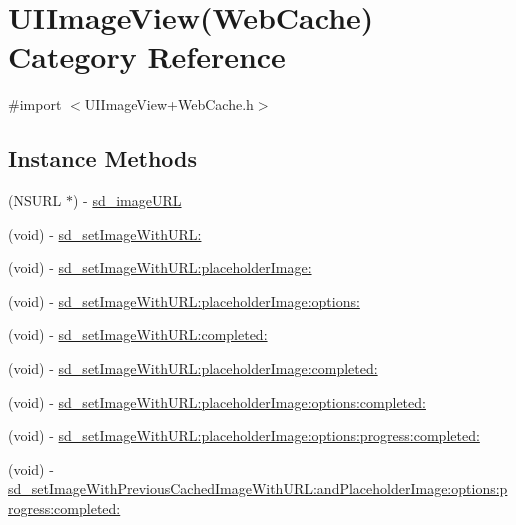 \hypertarget{category_u_i_image_view_07_web_cache_08}{}\section{U\+I\+Image\+View(Web\+Cache) Category Reference}
\label{category_u_i_image_view_07_web_cache_08}


{\ttfamily \#import $<$U\+I\+Image\+View+\+Web\+Cache.\+h$>$}

\subsection*{Instance Methods}
\begin{DoxyCompactItemize}
\item 
(N\+S\+U\+R\+L $\ast$) -\/ \hyperlink{category_u_i_image_view_07_web_cache_08_abf2a037e36bc88eb9deeddbccd160755}{sd\+\_\+image\+U\+R\+L}
\item 
(void) -\/ \hyperlink{category_u_i_image_view_07_web_cache_08_a577e2abff6711b6eb793b6cd19f11dd3}{sd\+\_\+set\+Image\+With\+U\+R\+L\+:}
\item 
(void) -\/ \hyperlink{category_u_i_image_view_07_web_cache_08_a9e5373efd3b38b43e57b90512bf507a9}{sd\+\_\+set\+Image\+With\+U\+R\+L\+:placeholder\+Image\+:}
\item 
(void) -\/ \hyperlink{category_u_i_image_view_07_web_cache_08_ad643f90323e0c8eb1893a6aed33ee157}{sd\+\_\+set\+Image\+With\+U\+R\+L\+:placeholder\+Image\+:options\+:}
\item 
(void) -\/ \hyperlink{category_u_i_image_view_07_web_cache_08_a7d507b69f6e4bebaf2a6294993d5bc1c}{sd\+\_\+set\+Image\+With\+U\+R\+L\+:completed\+:}
\item 
(void) -\/ \hyperlink{category_u_i_image_view_07_web_cache_08_aeec3efe268b94e18186397ae2c351bf7}{sd\+\_\+set\+Image\+With\+U\+R\+L\+:placeholder\+Image\+:completed\+:}
\item 
(void) -\/ \hyperlink{category_u_i_image_view_07_web_cache_08_a56fc8e991fe75497c8bf82650a61aef2}{sd\+\_\+set\+Image\+With\+U\+R\+L\+:placeholder\+Image\+:options\+:completed\+:}
\item 
(void) -\/ \hyperlink{category_u_i_image_view_07_web_cache_08_a0c6d9de0c9f624a1839d3fb8074d4442}{sd\+\_\+set\+Image\+With\+U\+R\+L\+:placeholder\+Image\+:options\+:progress\+:completed\+:}
\item 
(void) -\/ \hyperlink{category_u_i_image_view_07_web_cache_08_a24807a6b0b33f35c321f379d6f4c4d96}{sd\+\_\+set\+Image\+With\+Previous\+Cached\+Image\+With\+U\+R\+L\+:and\+Placeholder\+Image\+:options\+:progress\+:completed\+:}

\end{DoxyCompactItemize}
